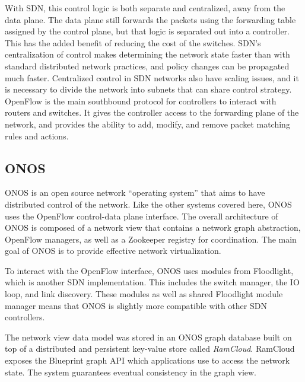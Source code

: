 \documentclass[letterpaper,twocolumn,10pt]{article}
\begin{document}
With SDN, this control logic is both separate and centralized, away from the data plane. The data plane still forwards the packets using the forwarding table assigned by the control plane, but that logic is separated out into a controller. This has the added benefit of reducing the cost of the switches. SDN's centralization of control makes determining the network state faster than with standard distributed network practices, and policy changes can be propagated much faster.
Centralized control in SDN networks also have scaling issues, and it is necessary to divide the network into subnets that can share control strategy. OpenFlow is the main southbound protocol for controllers to interact with routers and switches. It gives the controller access to the forwarding plane of the network, and provides the ability to add, modify, and remove packet matching rules and actions.\cite{mckeown2008openflow}

% 
% 
\subsection{ONOS}

ONOS is an open source network ``operating system'' that aims to have distributed control of the network. Like the other systems covered here, ONOS uses the OpenFlow control-data plane interface. The overall architecture of ONOS is composed of a network view that contains a network graph abstraction, OpenFlow managers, as well as a Zookeeper registry for coordination. The main goal of ONOS is to provide effective network virtualization.\cite{berde2014onos}

To interact with the OpenFlow interface, ONOS uses modules from Floodlight, which is another SDN implementation. This includes the switch manager, the IO loop, and link discovery. These modules as well as shared Floodlight module manager means that ONOS is slightly more compatible with other SDN controllers.

The network view data model was stored in an ONOS graph database built on top of a distributed and persistent key-value store called \emph{RamCloud}. RamCloud exposes the Blueprint graph API which applications use to access the network state. The system guarantees eventual consistency in the graph view.\cite{berde2014onos} 
\end{document}
